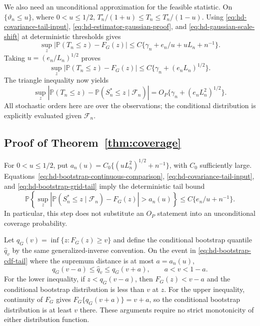 \documentclass[10pt]{book}
\newcommand{\prob}{\mathbb{P}}
\numberwithin{equation}{section}
\begin{document}
We also need an unconditional approximation for the feasible statistic.
On $\{\vartheta_n\le u\}$, where $0<u\le1/2$,
$T_n^\circ/(1+u)\le T_n\le T_n^\circ/(1-u)$.
Using \eqref{eq:hd-covariance-tail-input},
\eqref{eq:hd-estimator-gaussian-proof}, and
\eqref{eq:hd-gaussian-scale-shift} at deterministic thresholds gives
\[
 \sup_z|\prob(T_n\le z)-F_G(z)|
 \le C\{\gamma_n+e_n/u+uL_n+n^{-1}\}.
\]
Taking $u=(e_n/L_n)^{1/2}$ proves
\begin{equation}
 \sup_z|\prob(T_n\le z)-F_G(z)|
 \le C\{\gamma_n+(e_nL_n)^{1/2}\}.
 \label{eq:hd-feasible-gaussian-proof}
\end{equation}
The triangle inequality now yields
\[
 \sup_z|\prob(T_n\le z)-\prob(S_n^*\le z\mid\mathcal F_n)|
 =O_P\{\gamma_n+(e_nL_n^2)^{1/2}\}.
\]
All stochastic orders here are over the observations; the conditional
distribution is explicitly evaluated given $\mathcal F_n$.

\subsection{Proof of Theorem~\ref{thm:coverage}}

For $0<u\le1/2$, put
$a_n(u)=C_0\{(uL_n^2)^{1/2}+n^{-1}\}$, with $C_0$ sufficiently large.
Equations~\eqref{eq:hd-bootstrap-continuous-comparison},
\eqref{eq:hd-covariance-tail-input}, and
\eqref{eq:hd-bootstrap-grid-tail} imply the deterministic tail bound
\begin{equation}
 \prob\!\left\{\sup_z|\prob(S_n^*\le z\mid\mathcal F_n)-F_G(z)|
                   >a_n(u)\right\}
 \le C\{e_n/u+n^{-1}\}.
 \label{eq:hd-bootstrap-cdf-tail}
\end{equation}
In particular, this step does not substitute an $O_P$ statement into an
unconditional coverage probability.

Let $q_G(v)=\inf\{z:F_G(z)\ge v\}$ and define the conditional bootstrap
quantile $\widehat q_v$ by the same generalized-inverse convention.
On the event in \eqref{eq:hd-bootstrap-cdf-tail} where the supremum
distance is at most $a=a_n(u)$,
\begin{equation}
 q_G(v-a)\le\widehat q_v\le q_G(v+a),\qquad a<v<1-a.
 \label{eq:hd-quantile-bracket}
\end{equation}
For the lower inequality, if $z<q_G(v-a)$, then
$F_G(z)<v-a$ and the conditional bootstrap distribution is less than
$v$ at $z$. For the upper inequality, continuity of $F_G$ gives
$F_G\{q_G(v+a)\}=v+a$, so the conditional bootstrap distribution
is at least $v$ there. These arguments require no strict monotonicity
of either distribution function.
\end{document}
